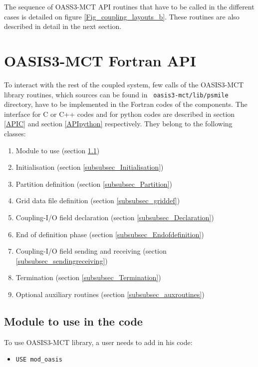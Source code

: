 The sequence of OASS3-MCT API routines that have to be called in the different cases is detailed on figure  \ref{Fig_coupling_layouts_b}.  These routines are also described in detail in the next section.

\section{OASIS3-MCT Fortran API}
\label{API}

To interact with the rest of the coupled system, few calls of the
OASIS3-MCT library routines, which sources can be found in {\tt
  oasis3-mct/lib/psmile} directory, have to be implemented in
the Fortran codes of the components. The interface for C or C++ codes and for python codes are described in section \ref{APIC} and section \ref{APIpython} respectively.
They belong to the following classes:
\begin{enumerate}
\item Module to use (section \ref{subsubsec_Use})
\item Initialisation (section \ref{subsubsec_Initialisation})
\item Partition definition (section \ref{subsubsec_Partition})
\item Grid data file definition (section \ref{subsubsec_griddef})
\item Coupling-I/O field declaration (section
  \ref{subsubsec_Declaration})
\item End of definition phase (section
  \ref{subsubsec_Endofdefinition})
\item Coupling-I/O field sending and receiving (section
  \ref{subsubsec_sendingreceiving})
\item Termination (section \ref{subsubsec_Termination})
\item Optional auxiliary routines (section
  \ref{subsubsec_auxroutines})
\end{enumerate}

\subsection{Module to use in the code}
\label{subsubsec_Use}

To use OASIS3-MCT library, a user needs to add in his code:

\begin{itemize}

\item {\tt USE mod\_oasis}

\end{itemize}

